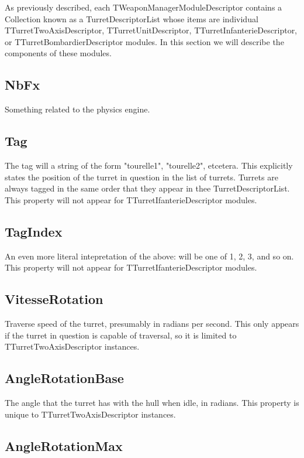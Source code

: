 \documentclass{article}
\begin{document}
As previously described, each TWeaponManagerModuleDescriptor contains a Collection known as a TurretDescriptorList whose items are individual TTurretTwoAxisDescriptor, TTurretUnitDescriptor, TTurretInfanterieDescriptor, or TTurretBombardierDescriptor modules. In this section we will describe the components of these modules.

\subsection{NbFx}

Something related to the physics engine.

\subsection{Tag}

The tag will a string of the form "tourelle1", "tourelle2", etcetera. This explicitly states the position of the turret in question in the list of turrets. Turrets are always tagged in the same order that they appear in thee TurretDescriptorList. This property will not appear for TTurretIfanterieDescriptor modules.

\subsection{TagIndex}

An even more literal intepretation of the above: will be one of 1, 2, 3, and so on. This property will not appear for TTurretIfanterieDescriptor modules.

\subsection{VitesseRotation}

Traverse speed of the turret, presumably in radians per second. This only appears if the turret in question is capable of traversal, so it is limited to TTurretTwoAxisDescriptor instances.

\subsection{AngleRotationBase}

The angle that the turret has with the hull when idle, in radians. This property is unique to TTurretTwoAxisDescriptor instances.

\subsection{AngleRotationMax}
\end{document}
